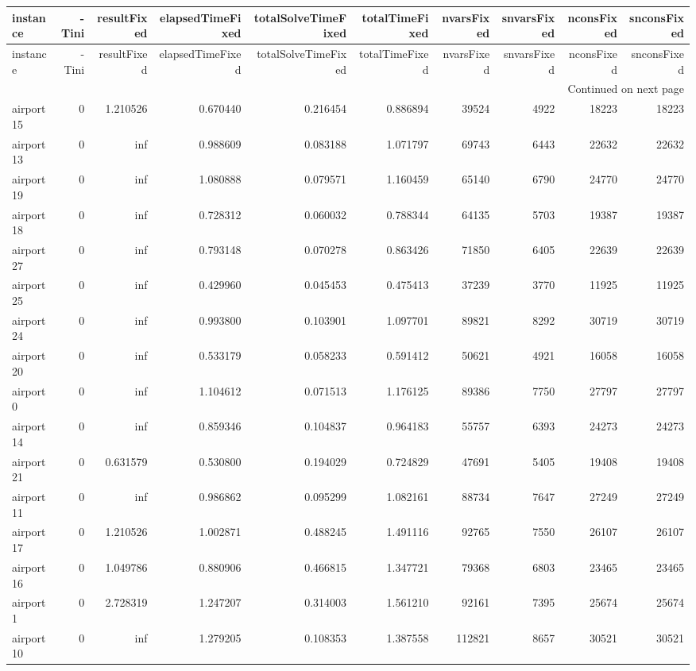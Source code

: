 
\begin{longtable}{|l|r|r|r|r|r|r|r|r|r|}
\toprule
instance & -Tini & resultFixed & elapsedTimeFixed & totalSolveTimeFixed & totalTimeFixed & nvarsFixed & snvarsFixed & nconsFixed & snconsFixed \\
\midrule
\endfirsthead
\toprule
instance & -Tini & resultFixed & elapsedTimeFixed & totalSolveTimeFixed & totalTimeFixed & nvarsFixed & snvarsFixed & nconsFixed & snconsFixed \\
\midrule
\endhead
\midrule
\multicolumn{10}{r}{Continued on next page} \\
\midrule
\endfoot
\bottomrule
\endlastfoot
airport15 & 0 & 1.210526 & 0.670440 & 0.216454 & 0.886894 & 39524 & 4922 & 18223 & 18223 \\
airport13 & 0 & inf & 0.988609 & 0.083188 & 1.071797 & 69743 & 6443 & 22632 & 22632 \\
airport19 & 0 & inf & 1.080888 & 0.079571 & 1.160459 & 65140 & 6790 & 24770 & 24770 \\
airport18 & 0 & inf & 0.728312 & 0.060032 & 0.788344 & 64135 & 5703 & 19387 & 19387 \\
airport27 & 0 & inf & 0.793148 & 0.070278 & 0.863426 & 71850 & 6405 & 22639 & 22639 \\
airport25 & 0 & inf & 0.429960 & 0.045453 & 0.475413 & 37239 & 3770 & 11925 & 11925 \\
airport24 & 0 & inf & 0.993800 & 0.103901 & 1.097701 & 89821 & 8292 & 30719 & 30719 \\
airport20 & 0 & inf & 0.533179 & 0.058233 & 0.591412 & 50621 & 4921 & 16058 & 16058 \\
airport0 & 0 & inf & 1.104612 & 0.071513 & 1.176125 & 89386 & 7750 & 27797 & 27797 \\
airport14 & 0 & inf & 0.859346 & 0.104837 & 0.964183 & 55757 & 6393 & 24273 & 24273 \\
airport21 & 0 & 0.631579 & 0.530800 & 0.194029 & 0.724829 & 47691 & 5405 & 19408 & 19408 \\
airport11 & 0 & inf & 0.986862 & 0.095299 & 1.082161 & 88734 & 7647 & 27249 & 27249 \\
airport17 & 0 & 1.210526 & 1.002871 & 0.488245 & 1.491116 & 92765 & 7550 & 26107 & 26107 \\
airport16 & 0 & 1.049786 & 0.880906 & 0.466815 & 1.347721 & 79368 & 6803 & 23465 & 23465 \\
airport1 & 0 & 2.728319 & 1.247207 & 0.314003 & 1.561210 & 92161 & 7395 & 25674 & 25674 \\
airport10 & 0 & inf & 1.279205 & 0.108353 & 1.387558 & 112821 & 8657 & 30521 & 30521 \\

\end{longtable}
